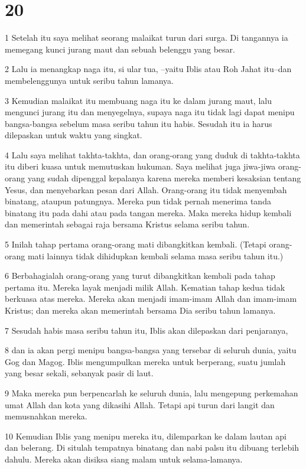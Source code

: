 \chapter{20}

\par 1 Setelah itu saya melihat seorang malaikat turun dari surga. Di tangannya ia memegang kunci jurang maut dan sebuah belenggu yang besar.
\par 2 Lalu ia menangkap naga itu, si ular tua, --yaitu Iblis atau Roh Jahat itu--dan membelenggunya untuk seribu tahun lamanya.
\par 3 Kemudian malaikat itu membuang naga itu ke dalam jurang maut, lalu mengunci jurang itu dan menyegelnya, supaya naga itu tidak lagi dapat menipu bangsa-bangsa sebelum masa seribu tahun itu habis. Sesudah itu ia harus dilepaskan untuk waktu yang singkat.
\par 4 Lalu saya melihat takhta-takhta, dan orang-orang yang duduk di takhta-takhta itu diberi kuasa untuk memutuskan hukuman. Saya melihat juga jiwa-jiwa orang-orang yang sudah dipenggal kepalanya karena mereka memberi kesaksian tentang Yesus, dan menyebarkan pesan dari Allah. Orang-orang itu tidak menyembah binatang, ataupun patungnya. Mereka pun tidak pernah menerima tanda binatang itu pada dahi atau pada tangan mereka. Maka mereka hidup kembali dan memerintah sebagai raja bersama Kristus selama seribu tahun.
\par 5 Inilah tahap pertama orang-orang mati dibangkitkan kembali. (Tetapi orang-orang mati lainnya tidak dihidupkan kembali selama masa seribu tahun itu.)
\par 6 Berbahagialah orang-orang yang turut dibangkitkan kembali pada tahap pertama itu. Mereka layak menjadi milik Allah. Kematian tahap kedua tidak berkuasa atas mereka. Mereka akan menjadi imam-imam Allah dan imam-imam Kristus; dan mereka akan memerintah bersama Dia seribu tahun lamanya.
\par 7 Sesudah habis masa seribu tahun itu, Iblis akan dilepaskan dari penjaranya,
\par 8 dan ia akan pergi menipu bangsa-bangsa yang tersebar di seluruh dunia, yaitu Gog dan Magog. Iblis mengumpulkan mereka untuk berperang, suatu jumlah yang besar sekali, sebanyak pasir di laut.
\par 9 Maka mereka pun berpencarlah ke seluruh dunia, lalu mengepung perkemahan umat Allah dan kota yang dikasihi Allah. Tetapi api turun dari langit dan memusnahkan mereka.
\par 10 Kemudian Iblis yang menipu mereka itu, dilemparkan ke dalam lautan api dan belerang. Di situlah tempatnya binatang dan nabi palsu itu dibuang terlebih dahulu. Mereka akan disiksa siang malam untuk selama-lamanya.

